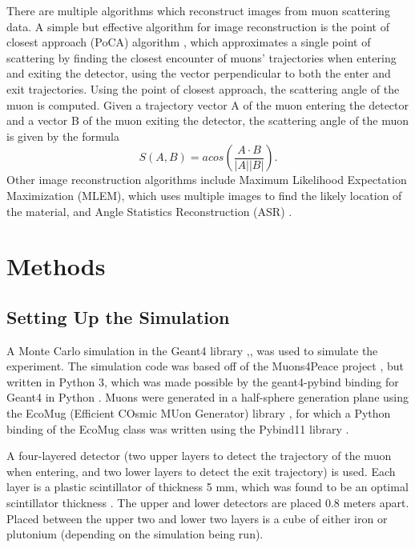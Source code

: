 \documentclass[10pt,a4paper]{article}
\begin{document}
    There are multiple algorithms which reconstruct images from muon scattering data. A simple but effective algorithm for image reconstruction is the point of closest approach (PoCA) algorithm \cite{international2022iaea}, which approximates a single point of scattering by finding the closest encounter of muons' trajectories when entering and exiting the detector, using the vector perpendicular to both the enter and exit trajectories. Using the point of closest approach, the scattering angle of the muon is computed. Given a trajectory vector A of the muon entering the detector and a vector B of the muon exiting the detector, the scattering angle of the muon is given by the formula
    \begin{equation}
        S(A ,B) = acos\left(\frac{A \cdot B}{|A||B|}\right).
    \end{equation}
    Other image reconstruction algorithms include Maximum Likelihood Expectation Maximization (MLEM), which uses multiple images to find the likely location of the material, and Angle Statistics Reconstruction (ASR) \cite{international2022iaea}.

\section{Methods}
\subsection{Setting Up the Simulation}
    A Monte Carlo simulation in the Geant4 library \cite{AGOSTINELLI2003250},\cite{ALLISON2016186},\cite{1610988} was used to simulate the experiment. The simulation code was based off of the Muons4Peace project \cite{adatz273muons4peace}, but written in Python 3, which was made possible by the geant4-pybind binding for Geant4 in Python \cite{haraldgeant4_pybind}. Muons were generated in a half-sphere generation plane using the EcoMug (Efficient COsmic MUon Generator) library \cite{pagano2021ecomug}, for which a Python binding of the EcoMug class was written using the Pybind11 library \cite{pybind11}.

    A four-layered detector (two upper layers to detect the trajectory of the muon when entering, and two lower layers to detect the exit trajectory) is used. Each layer is a plastic scintillator of thickness 5 mm, which was found to be an optimal scintillator thickness \cite{park2023development}. The upper and lower detectors are placed 0.8 meters apart. Placed between the upper two and lower two layers is a cube of either iron or plutonium (depending on the simulation being run).
\end{document}
